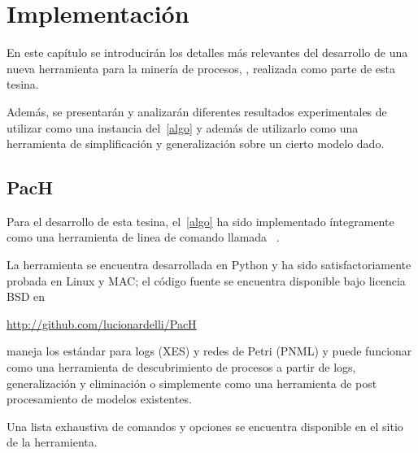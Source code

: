 \chapter[Implementación]{Implementación}

En este capítulo se introducirán los detalles más relevantes del desarrollo de una nueva
herramienta para la minería de procesos, \pachtool, realizada como parte de esta tesina. 

Además, se presentarán y analizarán diferentes resultados experimentales 
de utilizar \pachtool como una instancia del~\autoref{algo} y además
de utilizarlo como una herramienta de
simplificación y generalización sobre un cierto modelo dado. 

\section{PacH}
\label{sec:4.pach}

Para el desarrollo de esta tesina, el~\autoref{algo} ha sido implementado íntegramente 
como una herramienta de linea de comando llamada \pachtool~\cite{pach}.

La herramienta se encuentra desarrollada en Python y ha sido satisfactoriamente probada en Linux y MAC;
el código fuente se encuentra disponible bajo licencia BSD en
\begin{center}\url{http://github.com/lucionardelli/PacH}\end{center}

\pachtool maneja los estándar para logs (XES) y redes de Petri (PNML) y puede funcionar como 
una herramienta de descubrimiento de procesos a partir de logs, generalización y eliminación
o simplemente como una herramienta de post procesamiento de modelos existentes.

Una lista exhaustiva de comandos y opciones se encuentra disponible en el sitio de la herramienta.

%

